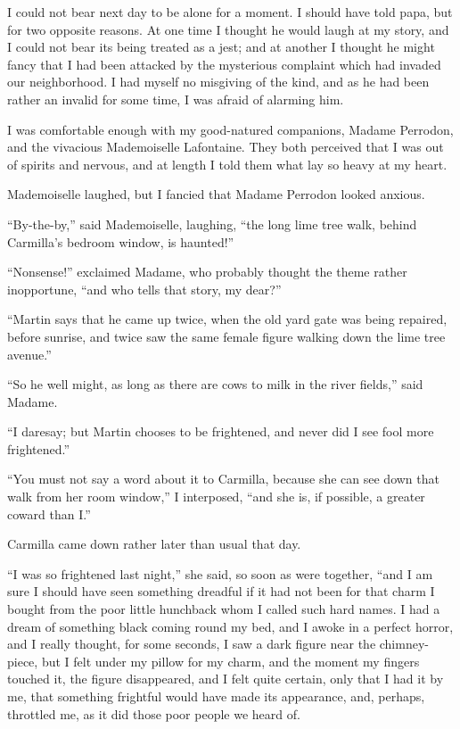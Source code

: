 \documentclass[11pt,twoside,makeidx,hidelinks,]{memoir}
\begin{document}
I could not bear next day to be alone for a moment. I should have told
papa, but for two opposite reasons. At one time I thought he would laugh
at my story, and I could not bear its being treated as a jest; and at
another I thought he might fancy that I had been attacked by the
mysterious complaint which had invaded our neighborhood. I had myself no
misgiving of the kind, and as he had been rather an invalid for some
time, I was afraid of alarming him.

I was comfortable enough with my good-natured companions, Madame
Perrodon, and the vivacious Mademoiselle Lafontaine. They both perceived
that I was out of spirits and nervous, and at length I told them what
lay so heavy at my heart.

Mademoiselle laughed, but I fancied that Madame Perrodon looked anxious.

``By-the-by,'' said Mademoiselle, laughing, ``the long lime tree walk,
behind Carmilla's bedroom window, is haunted!''

``Nonsense!'' exclaimed Madame, who probably thought the theme rather
inopportune, ``and who tells that story, my dear?''

``Martin says that he came up twice, when the old yard gate was being
repaired, before sunrise, and twice saw the same female figure walking
down the lime tree avenue.''

``So he well might, as long as there are cows to milk in the river
fields,'' said Madame.

``I daresay; but Martin chooses to be frightened, and never did I see
fool more frightened.''

``You must not say a word about it to Carmilla, because she can see down
that walk from her room window,'' I interposed, ``and she is, if possible,
a greater coward than I.''

Carmilla came down rather later than usual that day.

``I was so frightened last night,'' she said, so soon as were together,
``and I am sure I should have seen something dreadful if it had not been
for that charm I bought from the poor little hunchback whom I called
such hard names. I had a dream of something black coming round my bed,
and I awoke in a perfect horror, and I really thought, for some seconds,
I saw a dark figure near the chimney-piece, but I felt under my pillow
for my charm, and the moment my fingers touched it, the figure
disappeared, and I felt quite certain, only that I had it by me, that
something frightful would have made its appearance, and, perhaps,
throttled me, as it did those poor people we heard of.
\end{document}
